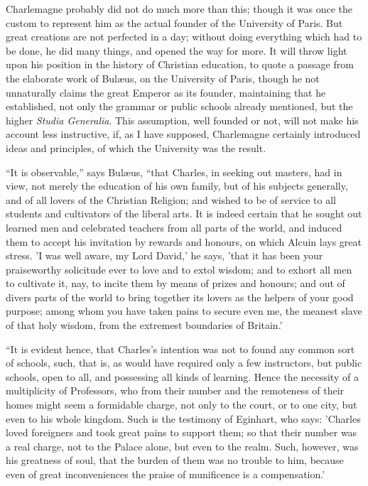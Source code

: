 Charlemagne probably did not
do much more than this; though it was once the custom to represent him
as the actual founder of the University of Paris. But great creations
are not perfected in a day; without doing everything which had to be
done, he did many things, and opened the way for more. It will throw
light upon his position in the history of Christian education, to
quote a passage from the elaborate work of Bulæus, on the
University of Paris, though he not unnaturally claims the great
Emperor as its founder, maintaining that he established, not only the
grammar or public schools already mentioned, but the higher \emph{Studia
Generalia}. This assumption, well founded or not, will not make his
account less instructive, if, as I have supposed, Charlemagne
certainly introduced ideas and principles, of which the University was
the result.

``It is observable,'' says
Bulæus, ``that Charles, in seeking out masters, had in view, not
merely the education of his own family, but of his subjects generally,
and of all lovers of the Christian Religion; and wished to be of
service to all students and cultivators of the liberal arts. It is
indeed certain that he sought out learned men and celebrated teachers
from all parts of the world, and induced them to accept his invitation
by rewards and honours, on which Alcuin lays great stress. 'I was well
aware, my Lord David,' he says, 'that it has been your praiseworthy
solicitude ever to love and to extol wisdom; and to exhort all men to
cultivate it, nay, to incite them by means of prizes and honours; and
out of divers parts of the world to bring together its lovers as the
helpers of your good purpose; among whom you have taken pains to
secure even me, the meanest slave of that holy wisdom, from the
extremest boundaries of Britain.'

``It is evident hence, that
Charles's intention was not to found any common sort of schools, such,
that is, as would have required only a few instructors, but public
schools, open to all, and possessing all kinds of learning. Hence the
necessity of a multiplicity of Professors, who from their number and
the remoteness of their homes might seem a formidable charge, not only
to the court, or to one city, but even to his whole kingdom.
Such is the testimony of Eginhart, who says: 'Charles loved foreigners
and took great pains to support them; so that their number was a real
charge, not to the Palace alone, but even to the realm. Such, however,
was his greatness of soul, that the burden of them was no trouble to
him, because even of great inconveniences the praise of munificence is
a compensation.'

